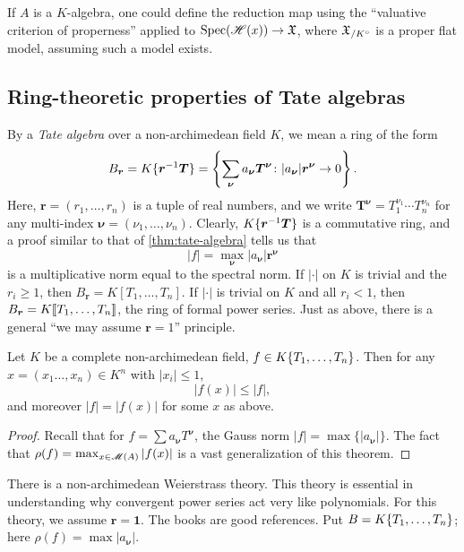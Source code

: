 If $A$ is a $K$-algebra, one could define the reduction map using the 
``valuative criterion of properness'' applied to $\operatorname{Spec}(\mathscr{H}(x))\to \mathfrak{X}$, 
where $\mathfrak{X}_{/K^\circ}$ is a proper flat model, assuming such a model exists. 







\subsection{Ring-theoretic properties of Tate algebras}

By a \emph{Tate algebra} over a non-archimedean field $K$, we mean a ring of 
the form 
\[
	B_{\bm r} = K\{ \bm r^{-1} \bm T \} = \left\{\sum_{\bm \nu} a_{\bm \nu} \bm T^{\bm \nu}\colon |a_{\bm \nu}| \bm r^{\bm \nu} \to 0\right\} .
\]
Here, $\bm r=(r_1,\dots,r_n)$ is a tuple of real numbers, and we write 
$\bm T^{\bm \nu} = T_1^{\nu_1} \dotsm T_n^{\nu_n}$ for any multi-index 
$\bm \nu=(\nu_1,\dots,\nu_n)$. Clearly, $K\{ \bm r^{-1} \bm T \}$ is a 
commutative ring, and a proof similar to that of \autoref{thm:tate-algebra} 
tells us that 
\[
	|f| = \max_{\bm\nu} |a_{\bm\nu}| \bm r^{\bm\nu}
\]
is a multiplicative norm equal to the spectral norm. If $|\cdot|$ on $K$ is 
trivial and the $r_i\geqslant 1$, then $B_{\bm r} = K[T_1,\dots,T_n]$. If 
$|\cdot|$ is trivial on $K$ and all $r_i<1$, then 
$B_{\bm r} = K\llbracket T_1,\dots,T_n\rrbracket$, the ring of formal power series. Just as 
above, there is a general ``we may assume $\bm r=1$'' principle. 

\begin{theorem}
Let $K$ be a complete non-archimedean field, $f\in K\{ T_1,\dots,T_n \}$. 
Then for any $x = (x_1\dots,x_n)\in K^n$ with $|x_i|\leqslant 1$, 
\[
	|f(x)| \leqslant |f| ,
\]
and moreover $|f|=|f(x)|$ for some $x$ as above. 
\end{theorem}
\begin{proof}
Recall that for $f=\sum a_{\bm\nu} T^{\bm \nu}$, the Gauss norm 
$|f|=\max\{|a_{\bm\nu}|\}$. The fact that 
$\rho(f)=\max_{x\in \operatorname{\mathscr{M}}(A)} |f(x)|$ is a vast generalization of this 
theorem. 
\end{proof}

There is a non-archimedean Weierstrass theory. This theory is essential in 
understanding why convergent power series act very like polynomials. For this 
theory, we assume $\bm r=\bm 1$. The books \cite{bgr-1984,bosch-2014} are 
good references. Put $B=K\{ T_1,\dots,T_n \}$; here 
$\rho(f) = \max|a_{\bm \nu}|$. 

